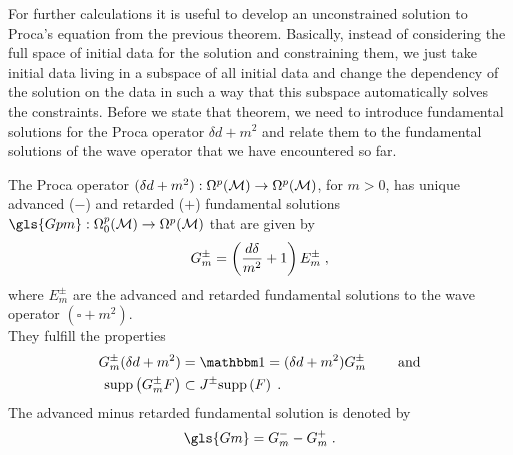 For further calculations it is useful to develop an unconstrained solution to Proca's equation from the previous theorem.
Basically, instead of considering the full space of initial data for the solution and constraining them, we just take initial data living in a subspace of all initial data and change the dependency of the solution on the data in such a way that this subspace automatically solves the constraints.
Before we state that theorem, we need to introduce fundamental solutions for the Proca operator $\delta d + m^2$ and relate them to the fundamental solutions of the wave operator that we have encountered so far.
%
%
\begin{lemma}\label{lem:fundamental_solution_proca_operator}
The Proca operator  $(\delta d + m^2) : \Omega^p(\mathcal{M}) \to \Omega^p(\mathcal{M})$, for $m > 0$,  has unique advanced ($-$) and retarded ($+$) fundamental solutions $\gls{Gpm} : \Omega^p_0(\M) \to \Omega^p(\M)$ that are given by
\begin{align}
G_m^\pm = \left( \frac{d \delta}{m^2} + 1\right) E_m^\pm \;,
\end{align}
where $E^\pm_m$ are the advanced and retarded fundamental solutions to the wave operator $(\square + m^2)$. \\
They fulfill the properties
\begin{subequations}
\begin{align}
 G_m^\pm (\delta d + m^2) &= \mathbbm 1 = (\delta d + m^2) G_m^\pm \formspace \text{\upshape{\quad\quad and}} \label{def:fundamental_solution_proca_operator} \\
 \supp{G_m^\pm F } &\subset J^\pm \supp{F } \label{def:fundamental_solution_proca_support} \formspace.
\end{align}
\end{subequations}
The advanced minus retarded fundamental solution is denoted by
\begin{align}
\gls{Gm} = G_m^- - G_m^+ \formspace.
\end{align}
\end{lemma}
%
